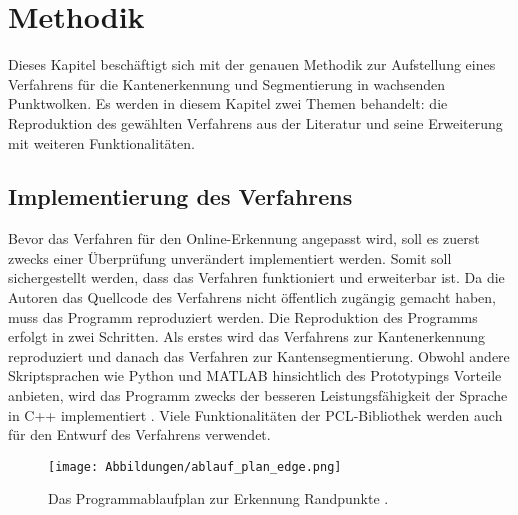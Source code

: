 

\chapter{Methodik} \label{Methodik}
Dieses Kapitel beschäftigt sich mit der genauen Methodik zur Aufstellung eines Verfahrens für die Kantenerkennung und Segmentierung in wachsenden Punktwolken. Es werden in diesem Kapitel zwei Themen behandelt: die Reproduktion des gewählten Verfahrens aus der Literatur und seine Erweiterung mit weiteren Funktionalitäten. 

\section{Implementierung des Verfahrens}
Bevor das Verfahren für den Online-Erkennung angepasst wird, soll es zuerst zwecks einer Überprüfung unverändert implementiert werden. Somit soll sichergestellt werden, dass das Verfahren funktioniert und erweiterbar ist. Da die Autoren das Quellcode des Verfahrens nicht öffentlich zugängig gemacht haben, muss das Programm reproduziert werden. Die Reproduktion des Programms erfolgt in zwei Schritten. Als erstes wird das Verfahrens zur Kantenerkennung reproduziert und danach das Verfahren zur Kantensegmentierung. Obwohl andere Skriptsprachen wie Python und MATLAB hinsichtlich des Prototypings Vorteile anbieten, wird das Programm zwecks der besseren Leistungsfähigkeit der Sprache in C++ implementiert \autocite{svensson_performance_2021}. Viele Funktionalitäten der PCL-Bibliothek \autocite{rusu_3d_2011} werden auch für den Entwurf des Verfahrens verwendet.

\begin{figure}[h]
	\texttt{[image: Abbildungen/ablauf\_plan\_edge.png]}
	\centering
	\caption[Programmablaufplan zur Kantenerkennung]{Das Programmablaufplan zur Erkennung Randpunkte \autocite{ni_edge_2016}.}
	\label{flow_chart}
\end{figure}

